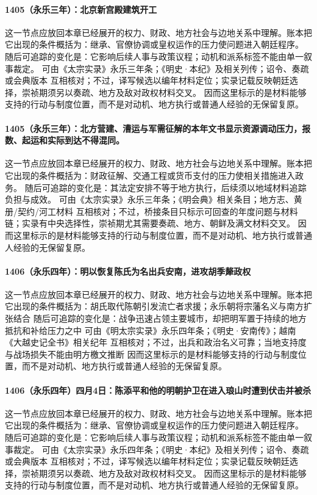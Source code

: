 \paragraph{1405（永乐三年）：北京新宫殿建筑开工} 这一节点应放回本章已经展开的权力、财政、地方社会与边地关系中理解。账本把它出现的条件概括为：继承、官僚协调或皇权运作的压力使问题进入朝廷程序。 随后可追踪的变化是：它影响后续人事与政策议程；动机和派系标签不能由单一叙事裁定。 可由《太宗实录》永乐三年条；《明史·本纪》及相关列传；诏令、奏疏或会典版本 互相核对；不过，译写候选以编年材料定位；实录记载反映朝廷选择，崇祯期须另以奏疏、地方及敌对政权材料交叉。 因而这里标示的是材料能够支持的行动与制度位置，而不是对动机、地方执行或普通人经验的无保留复原。

\paragraph{1405（永乐三年）：北方营建、漕运与军需征解的本年文书显示资源调动压力，报数、起运和实际到达不得混同。} 这一节点应放回本章已经展开的权力、财政、地方社会与边地关系中理解。账本把它出现的条件概括为：财政征解、交通工程或货币支付的压力使相关措施进入政务。 随后可追踪的变化是：其法定安排不等于地方执行，后续须以地域材料追踪负担与成效。 可由《太宗实录》永乐三年条；《明会典》相关条目；地方志、黄册/契约/河工材料 互相核对；不过，桥接条目只标示可回查的年度问题与材料链；实录有中央选择性，崇祯期尤其需要奏疏、地方、朝鲜及满文材料交叉。 因而这里标示的是材料能够支持的行动与制度位置，而不是对动机、地方执行或普通人经验的无保留复原。

\paragraph{1406（永乐四年）：明以恢复陈氏为名出兵安南，进攻胡季犛政权} 这一节点应放回本章已经展开的权力、财政、地方社会与边地关系中理解。账本把它出现的条件概括为：胡氏取代陈朝引发流亡者求援；永乐朝将宗藩名义与南方扩张结合 随后可追踪的变化是：战争迅速占领主要城市，却把明军置于持续的地方抵抗和补给压力之中 可由《明太宗实录》永乐四年条；《明史·安南传》；越南《大越史记全书》相关纪年 互相核对；不过，出兵和政治名义可靠；当地支持度与战场损失不能由明方檄文推断 因而这里标示的是材料能够支持的行动与制度位置，而不是对动机、地方执行或普通人经验的无保留复原。

\paragraph{1406（永乐四年）四月4日：陈添平和他的明朝护卫在进入琅山时遭到伏击并被杀} 这一节点应放回本章已经展开的权力、财政、地方社会与边地关系中理解。账本把它出现的条件概括为：继承、官僚协调或皇权运作的压力使问题进入朝廷程序。 随后可追踪的变化是：它影响后续人事与政策议程；动机和派系标签不能由单一叙事裁定。 可由《太宗实录》永乐四年条；《明史·本纪》及相关列传；诏令、奏疏或会典版本 互相核对；不过，译写候选以编年材料定位；实录记载反映朝廷选择，崇祯期须另以奏疏、地方及敌对政权材料交叉。 因而这里标示的是材料能够支持的行动与制度位置，而不是对动机、地方执行或普通人经验的无保留复原。

